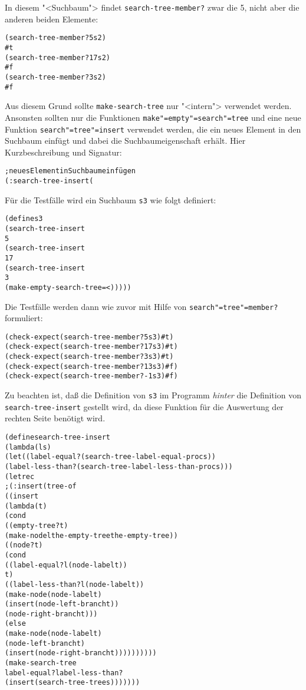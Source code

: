 %
In diesem "<Suchbaum"> findet \texttt{search-tree-member?} zwar
die 5, nicht aber die anderen beiden Elemente:\label{label:non-search-tree}
%
\begin{alltt}
(search-tree-member? 5 s2)
\evalsto{} #t
(search-tree-member? 17 s2)
\evalsto{} #f
(search-tree-member? 3 s2)
\evalsto{} #f
\end{alltt}
%
Aus diesem Grund sollte \texttt{make-search-tree} nur "<intern">
verwendet werden.   Ansonsten sollten nur die Funktionen \texttt{make"=empty"=search"=tree} und eine
neue Funktion \texttt{search"=tree"=insert} verwendet werden, die
ein neues Element in den
Suchbaum einfügt und dabei die Suchbaumeigenschaft
erhält.
Hier Kurzbeschreibung und Signatur:
%
\begin{alltt}
; neues Element in Suchbaum einfügen
(: search-tree-insert (%a (search-tree-of %a) -> (search-tree-of %a)))
\end{alltt}
%
Für die Testfälle wird ein Suchbaum \texttt{s3} wie folgt definiert:
%
\begin{alltt}
(define s3
  (search-tree-insert
   5
   (search-tree-insert
    17
    (search-tree-insert
     3
     (make-empty-search-tree = <)))))
\end{alltt}
%
Die Testfälle werden dann wie zuvor mit Hilfe von
\texttt{search"=tree"=member?} formuliert:
%
\begin{alltt}
(check-expect (search-tree-member? 5 s3) #t)
(check-expect (search-tree-member? 17 s3) #t)
(check-expect (search-tree-member? 3 s3) #t)
(check-expect (search-tree-member? 13 s3) #f)
(check-expect (search-tree-member? -1 s3) #f)
\end{alltt}
%
Zu beachten ist, daß die Definition von \texttt{s3} im Programm
\emph{hinter} die Definition von \texttt{search-tree-insert} gestellt
wird, da diese Funktion für die Auswertung der rechten Seite benötigt wird.
%
\begin{alltt}
(define search-tree-insert
  (lambda (l s)
    (let ((label-equal? (search-tree-label-equal-proc s))
          (label-less-than? (search-tree-label-less-than-proc s)))
      (letrec
          ; (: insert (tree-of %a) -> (tree-of %a))
          ((insert
            (lambda (t)
              (cond
               ((empty-tree? t)
                (make-node l the-empty-tree the-empty-tree))
               ((node? t)
                (cond
                  ((label-equal? l (node-label t))
                   t)
                  ((label-less-than? l (node-label t))
                   (make-node (node-label t)
                              (insert (node-left-branch t))
                              (node-right-branch t)))
                  (else
                   (make-node (node-label t)
                              (node-left-branch t)
                              (insert (node-right-branch t))))))))))
        (make-search-tree
         label-equal? label-less-than?
         (insert (search-tree-tree s)))))))
\end{alltt}
